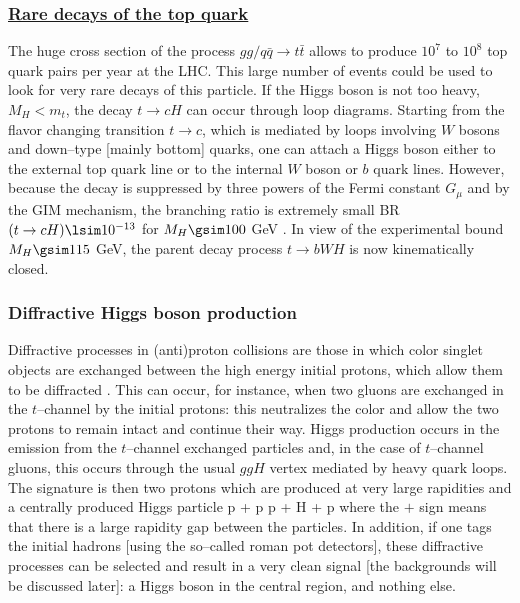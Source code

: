 \subsubsection*{\underline{Rare decays of the top quark}}

The huge cross section of the process $gg/q\bar{q} \to t\bar{t}$
allows  to produce $10^{7}$ to $10^{8}$ top quark pairs per year at the LHC. 
This large number of events could be used to look for very rare decays of this
particle. If the Higgs boson is not too heavy, $M_H < m_t$, the decay $t \to
cH$ can occur through loop diagrams. Starting from the flavor changing
transition  $t \to c$, which is mediated by loops involving $W$ bosons and
down--type [mainly bottom] quarks, one can attach a Higgs boson either to the
external  top quark line or to the internal $W$ boson or $b$ quark lines. 
However, because the decay is suppressed by three powers of the Fermi
constant $G_\mu$ and by the GIM mechanism, the branching ratio is extremely
small BR$(t \to cH) \lsim 10^{-13}$ for $M_H \gsim 100$ GeV \cite{pp-t-H}. 
In view of the experimental bound $M_H \gsim 115$ GeV, the parent decay process
$t \to bWH$ \cite{Three-Body2,pp-t-H2} is now kinematically closed. 


\subsubsection{Diffractive Higgs boson production}

Diffractive processes in (anti)proton collisions are those in which color 
singlet objects are exchanged between the high energy initial protons, which 
allow them to be diffracted \cite{BL-diffr,diffr1,diffr2}. This can occur, for 
instance, when two gluons are exchanged in the $t$--channel by the initial 
protons: this neutralizes the color
and allow the two protons to remain intact and continue their way. Higgs 
production occurs in the emission from the $t$--channel exchanged particles and,
in the case of $t$--channel gluons, this occurs through the usual $ggH$ vertex 
mediated by heavy quark loops. The signature is then two protons which are 
produced at very large rapidities and a centrally produced Higgs particle 
\beq 
p + p \to p + H + p
\eeq
where the $+$ sign means that  there is a large rapidity gap between the 
particles. In addition, if one tags the initial hadrons [using the so--called 
roman pot detectors], these diffractive processes can be selected and result 
in a very clean signal [the backgrounds will be discussed later]: a Higgs boson
in the central region, and nothing else.\s

